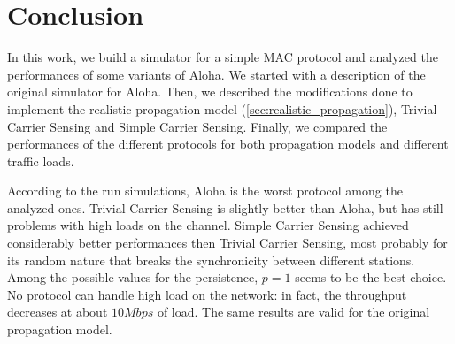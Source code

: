\section{Conclusion}
\label{sec:conclusion}

In this work, we build a simulator for a simple \ac{MAC} protocol and analyzed the performances of some variants of Aloha.
We started with a description of the original simulator for Aloha.
Then, we described the modifications done to implement the realistic propagation model (\cref{sec:realistic_propagation}), Trivial Carrier Sensing and Simple Carrier Sensing.
Finally, we compared the performances of the different protocols for both propagation models and different traffic loads.

According to the run simulations, Aloha is the worst protocol among the analyzed ones.
Trivial Carrier Sensing is slightly better than Aloha, but has still problems with high loads on the channel.
Simple Carrier Sensing achieved considerably better performances then Trivial Carrier Sensing, most probably for its random nature that breaks the synchronicity between different stations.
Among the possible values for the persistence, $p = 1$ seems to be the best choice.
No protocol can handle high load on the network: in fact, the throughput decreases at about $10 Mbps$ of load.
The same results are valid for the original propagation model.
